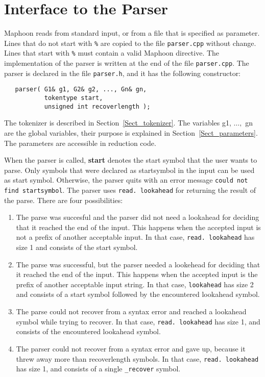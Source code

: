 \documentclass{article}
\begin{document}
\section{Interface to the Parser}
\label{Sect_interface}


\noindent
Maphoon reads from standard input, or from a file that is specified
as parameter.
Lines that do not start with \verb+%+ are copied to the file
\verb+parser.cpp+ without
change. Lines that start with \verb+%+ must contain a valid 
Maphoon directive. The implementation of the parser is written
at the end of the file \verb+parser.cpp+.
The parser is declared in the file \verb+parser.h+, and it has the following
constructor: 

\begin{verbatim}
   parser( G1& g1, G2& g2, ..., Gn& gn,
           tokentype start, 
           unsigned int recoverlength ); 
\end{verbatim}

\noindent
The tokenizer is described in Section~\ref{Sect_tokenizer}. 
The variables g1, $ \ldots, $ gn are the global variables, their
purpose is explained in Section~\ref{Sect_parameters}.
The parameters are accessible in reduction code. 

When the parser is called, 
{\bf start} denotes the start symbol that the user wants to parse.
Only symbols that were declared as startsymbol in the input
can be used as start symbol. Otherwise, the parser quits with 
an error message \verb+could not find startsymbol+.
The parser uses \verb+read. lookahead+ for returning the result
of the parse. There are four possibilities:
\begin{enumerate}
\item
   The parse was succesful and the parser did not need a lookahead
   for deciding that it reached the end of the input. 
   This happens when the accepted input is not a prefix of another
   acceptable input.
   In that case, \verb+read. lookahead+ has size 1 and 
   consists of the start symbol.
\item
   The parse was successful, but the parser needed a lookehead for
   deciding that it reached the end of the input.
   This happens when the accepted input is the prefix of another
   acceptable input string. 
   In that case, \verb+lookahead+ has size 2 and consists of a start symbol
   followed by the encountered lookahead symbol.
\item
   The parse could not recover from a syntax error and reached
   a lookahead symbol while trying to recover.
   In that case, \verb+read. lookahead+ has size 1, and consists of
   the encountered lookahead symbol.
\item
   The parser could not recover from a syntax error and gave up,
   because it threw away more than recoverlength symbols.
   In that case, \verb+read. lookahead+ has size 1, and consists
   of a single \verb+_recover+ symbol.
\end{enumerate}
\end{document}
